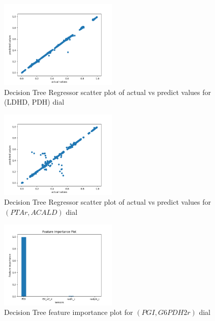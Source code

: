\documentclass[12pt,chapterheads]{ucsd}
\begin{document}
\begin{figure}[h] 
\centering
\includegraphics[width=0.5\textwidth]{Figures/LDH_D_PDH_dtr}
\caption[Decision Tree Regressor scatter plot of actual vs predict values for \string(LDH\textunderscore D, PDH) dial]
{Decision Tree Regressor scatter plot of actual vs predict values for \string(LDH\textunderscore D, PDH) dial}
\label{fig:LdhPdhDtr}
\end{figure}

\begin{figure}[h] 
\centering
\includegraphics[width=0.5\textwidth]{Figures/PTAr_ACALD_dtr}
\caption[Decision Tree Regressor scatter plot of actual vs predict values for $(PTAr, ACALD)$ dial]
{Decision Tree Regressor scatter plot of actual vs predict values for $(PTAr, ACALD)$ dial}
\label{fig:PtarAcaldDtr}
\end{figure}

\begin{figure}[h] 
\centering
\includegraphics[width=0.5\textwidth]{Figures/PGI_G6PDH2r_dtr_important_features}
\caption[Decision Tree feature importance plot for $(PGI, G6PDH2r)$ dial]
{Decision Tree feature importance plot for $(PGI, G6PDH2r)$ dial}
\label{fig:PgiG6pdh2rDtrImp}
\end{figure}
\end{document}
